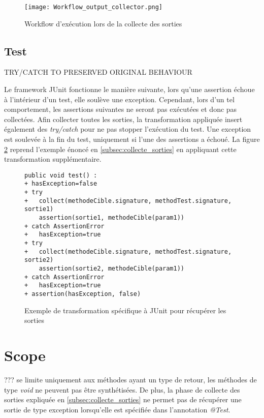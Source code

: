 \begin{figure}[H]
\begin{center}

\texttt{[image: Workflow\_output\_collector.png]}

\end{center}
\caption{Workflow d'exécution lors de la collecte des sorties}
\label{fig:workflow_collectes_sorties}
\end{figure}

\subsection{Test}

\par TRY/CATCH TO PRESERVED ORIGINAL BEHAVIOUR

\par Le framework JUnit fonctionne le manière suivante, lors qu'une assertion échoue à l'intérieur d'un test, elle soulève une exception. Cependant, lors d'un tel comportement, les assertions suivantes ne seront pas exécutées et donc pas collectées. Afin collecter toutes les sorties, la transformation appliquée insert également des \textit{try/catch} pour ne pas stopper l'exécution du test. Une exception est soulevée à la fin du test, uniquement si l'une des assertions a échoué. La figure \ref{fig:collect_sorties_try_catch} reprend l'exemple énoncé en \ref{subsec:collecte_sorties} en appliquant cette transformation supplémentaire.

\begin{figure}[H]
\begin{lstlisting}
public void test() :
+ hasException=false
+ try
+   collect(methodeCible.signature, methodTest.signature, sortie1)
    assertion(sortie1, methodeCible(param1))
+ catch AssertionError
+   hasException=true
+ try
+   collect(methodeCible.signature, methodTest.signature, sortie2)
    assertion(sortie2, methodeCible(param1))
+ catch AssertionError
+   hasException=true
+ assertion(hasException, false)
\end{lstlisting}
\caption{Exemple de transformation spécifique à JUnit pour récupérer les sorties}
\label{fig:collect_sorties_try_catch}
\end{figure}

\section{Scope}
\label{sec:scope}

\par ??? se limite uniquement aux méthodes ayant un type de retour, les méthodes de type \textit{void} ne peuvent pas être synthétisées. De plus, la phase de collecte des sorties expliquée en \ref{subsec:collecte_sorties} ne permet pas de récupérer une sortie de type exception lorsqu'elle est spécifiée dans l'annotation \textit{@Test}.





